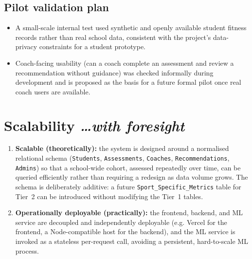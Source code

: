 \documentclass[11pt,a4paper]{article}
\newcommand{\BvrHint}[1]{%
  {\normalfont\normalsize\itshape\hfill #1}}
\begin{document}
\subsection{Pilot validation plan}
\begin{itemize}[leftmargin=0.7cm]
    \item A small-scale internal test used synthetic and openly available student fitness records rather than real school data, consistent with the project's data-privacy constraints for a student prototype.
    \item Coach-facing usability (can a coach complete an assessment and review a recommendation without guidance) was checked informally during development and is proposed as the basis for a future formal pilot once real coach users are available.
\end{itemize}

\section{Scalability %
\BvrHint{\ldots with foresight}}
\label{sec:scalability}
\begin{enumerate}[leftmargin=0.7cm]
    \item \textbf{Scalable (theoretically):} the system is designed around a normalised relational schema (\texttt{Students}, \texttt{Assessments}, \texttt{Coaches}, \texttt{Recommendations}, \texttt{Admins}) so that a school-wide cohort, assessed repeatedly over time, can be queried efficiently rather than requiring a redesign as data volume grows. The schema is deliberately additive: a future \texttt{Sport\_Specific\_Metrics} table for Tier~2 can be introduced without modifying the Tier~1 tables.
    \item \textbf{Operationally deployable (practically):} the frontend, backend, and ML service are decoupled and independently deployable (e.g. Vercel for the frontend, a Node-compatible host for the backend), and the ML service is invoked as a stateless per-request call, avoiding a persistent, hard-to-scale ML process.
\end{enumerate}
\end{document}
